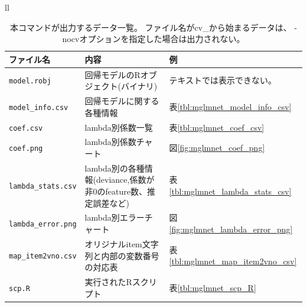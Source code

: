 \begin{table}[htbp]
\begin{center}
\begin{tabular}{ll}

\begin{minipage}{1.0\hsize}
\begin{center}
\caption{本コマンドが出力するデータ一覧。
ファイル名がcv\_から始まるデータは、
-nocvオプションを指定した場合は出力されない。\label{tbl:mglmnet_out}}
{\small
\begin{tabular}{lll}
\hline
ファイル名&内容&例\\
\hline
\verb|model.robj|       & 回帰モデルのRオブジェクト(バイナリ)         & テキストでは表示できない。\\
\verb|model_info.csv|   & 回帰モデルに関する各種情報                  & 表\ref{tbl:mglmnet_model_info_csv} \\
\verb|coef.csv|         & lambda別係数一覧                            & 表\ref{tbl:mglmnet_coef_csv} \\
\verb|coef.png|         & lambda別係数チャート                        & 図\ref{fig:mglmnet_coef_png} \\
\verb|lambda_stats.csv| & lambda別の各種情報(deviance,係数が非0のfeature数、推定誤差など) & 表\ref{tbl:mglmnet_lambda_stats_csv} \\
\verb|lambda_error.png| & lambda別エラーチャート                      & 図\ref{fig:mglmnet_lambda_error_png} \\
\verb|map_item2vno.csv| & オリジナルitem文字列と内部の変数番号の対応表& 表\ref{tbl:mglmnet_map_item2vno_csv} \\
\verb|scp.R|            & 実行されたRスクリプト                       & 表\ref{tbl:mglmnet_scp_R} \\
\hline
\end{tabular} 
}
\end{center}
\end{minipage}

\end{tabular} 
\end{center}
\end{table} 

